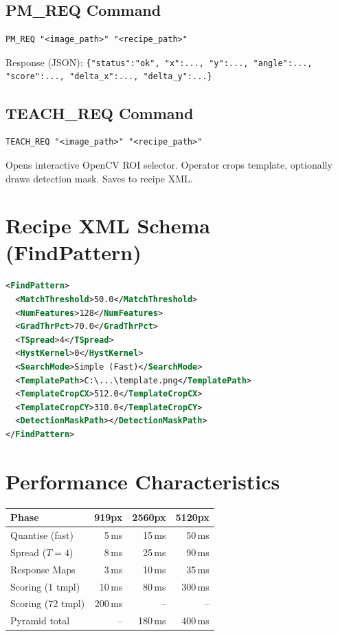 \documentclass[11pt,a4paper]{article}
\begin{document}
\subsection{PM\_REQ Command}
\begin{verbatim}
PM_REQ "<image_path>" "<recipe_path>"
\end{verbatim}
Response (JSON): \texttt{\{"status":"ok", "x":..., "y":..., "angle":..., "score":..., "delta\_x":..., "delta\_y":...\}}

\subsection{TEACH\_REQ Command}
\begin{verbatim}
TEACH_REQ "<image_path>" "<recipe_path>"
\end{verbatim}
Opens interactive OpenCV ROI selector. Operator crops template, optionally draws detection mask. Saves to recipe XML.

\section{Recipe XML Schema (FindPattern)}
\begin{lstlisting}[language=XML]
<FindPattern>
  <MatchThreshold>50.0</MatchThreshold>
  <NumFeatures>128</NumFeatures>
  <GradThrPct>70.0</GradThrPct>
  <TSpread>4</TSpread>
  <HystKernel>0</HystKernel>
  <SearchMode>Simple (Fast)</SearchMode>
  <TemplatePath>C:\...\template.png</TemplatePath>
  <TemplateCropCX>512.0</TemplateCropCX>
  <TemplateCropCY>310.0</TemplateCropCY>
  <DetectionMaskPath></DetectionMaskPath>
</FindPattern>
\end{lstlisting}

\section{Performance Characteristics}

\begin{tabular}{lrrr}\toprule
\textbf{Phase} & \textbf{919px} & \textbf{2560px} & \textbf{5120px}\\\midrule
Quantise (fast) & 5\,ms & 15\,ms & 50\,ms\\
Spread ($T{=}4$) & 8\,ms & 25\,ms & 90\,ms\\
Response Maps & 3\,ms & 10\,ms & 35\,ms\\
Scoring (1 tmpl) & 10\,ms & 80\,ms & 300\,ms\\
Scoring (72 tmpl) & 200\,ms & -- & --\\
Pyramid total & -- & 180\,ms & 400\,ms\\\bottomrule
\end{tabular}
\end{document}
